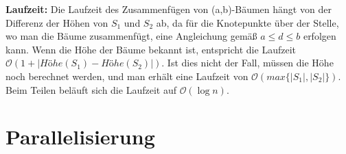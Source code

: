\par
\textbf{Laufzeit: } Die Laufzeit des Zusammenfügen von (a,b)-Bäumen hängt von der Differenz der Höhen von $S_1$ und $S_2$ ab, da für die Knotepunkte über der Stelle, wo man die Bäume zusammenfügt, eine Angleichung gemäß $a \leq d \leq b$ erfolgen kann. Wenn die Höhe der Bäume bekannt ist, entspricht die Laufzeit $\mathcal{O} (1 + | Höhe(S_1) - Höhe(S_2) |)$. Ist dies nicht der Fall, müssen die Höhe noch berechnet werden, und man erhält eine Laufzeit von $\mathcal{O} (max\{|S_1|, |S_2|\})$. \cite{Sanders:19}
\\
Beim Teilen beläuft sich die Laufzeit auf $\mathcal{O}(\log n)$. \cite{Sanders:19}


\chapter{Parallelisierung}
\label{chapter:Parallelisierung}

